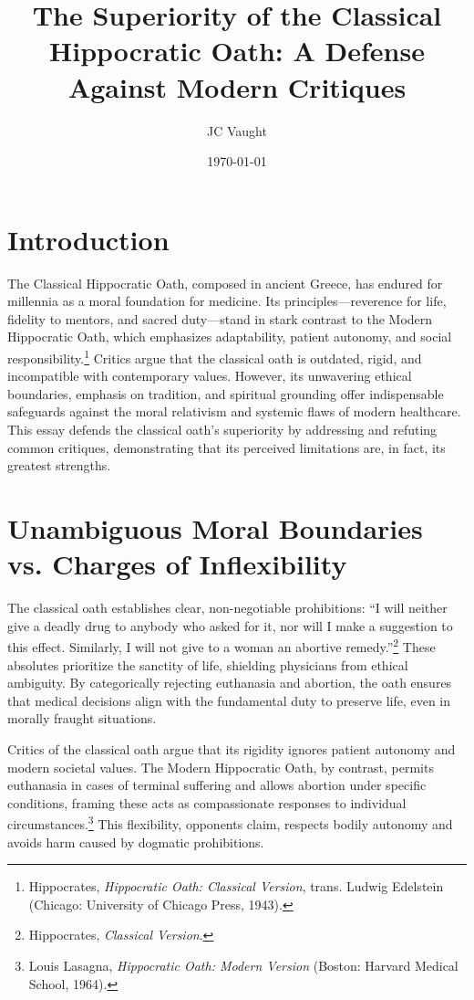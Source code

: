 \documentclass[12pt]{article}
\title{The Superiority of the Classical Hippocratic Oath: A Defense Against Modern Critiques}
\author{JC Vaught}
\date{\today}
\begin{document}
\maketitle

\section*{Introduction}

The Classical Hippocratic Oath, composed in ancient Greece, has endured for millennia as a moral foundation for medicine. Its principles—reverence for life, fidelity to mentors, and sacred duty—stand in stark contrast to the Modern Hippocratic Oath, which emphasizes adaptability, patient autonomy, and social responsibility.\footnote{Hippocrates, \textit{Hippocratic Oath: Classical Version}, trans. Ludwig Edelstein (Chicago: University of Chicago Press, 1943).} Critics argue that the classical oath is outdated, rigid, and incompatible with contemporary values. However, its unwavering ethical boundaries, emphasis on tradition, and spiritual grounding offer indispensable safeguards against the moral relativism and systemic flaws of modern healthcare. This essay defends the classical oath’s superiority by addressing and refuting common critiques, demonstrating that its perceived limitations are, in fact, its greatest strengths.

\section*{Unambiguous Moral Boundaries vs. Charges of Inflexibility}

The classical oath establishes clear, non-negotiable prohibitions: “I will neither give a deadly drug to anybody who asked for it, nor will I make a suggestion to this effect. Similarly, I will not give to a woman an abortive remedy.”\footnote{Hippocrates, \textit{Classical Version}.} These absolutes prioritize the sanctity of life, shielding physicians from ethical ambiguity. By categorically rejecting euthanasia and abortion, the oath ensures that medical decisions align with the fundamental duty to preserve life, even in morally fraught situations.

Critics of the classical oath argue that its rigidity ignores patient autonomy and modern societal values. The Modern Hippocratic Oath, by contrast, permits euthanasia in cases of terminal suffering and allows abortion under specific conditions, framing these acts as compassionate responses to individual circumstances.\footnote{Louis Lasagna, \textit{Hippocratic Oath: Modern Version} (Boston: Harvard Medical School, 1964).} This flexibility, opponents claim, respects bodily autonomy and avoids harm caused by dogmatic prohibitions.
\end{document}
